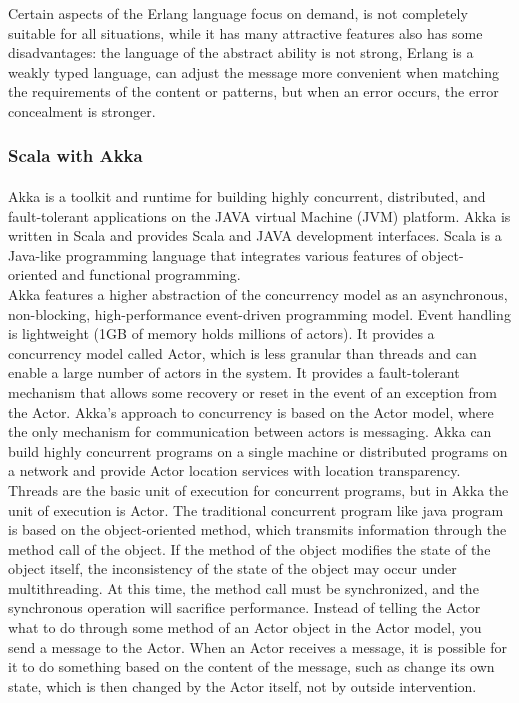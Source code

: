 \documentclass{article}
\begin{document}
Certain aspects of the Erlang language focus on demand, is not completely suitable for all situations, while it has many attractive features also has some disadvantages: the language of the abstract ability is not strong, Erlang is a weakly typed language, can adjust the message more convenient when matching the requirements of the content or patterns, but when an error occurs, the error concealment is stronger.\\

\subsubsection{Scala with Akka}\vspace{16pt}
\paragraph{}\vspace{11pt}\justifying
Akka is a toolkit and runtime for building highly concurrent, distributed, and fault-tolerant applications on the JAVA virtual Machine (JVM) platform. Akka is written in Scala and provides Scala and JAVA development interfaces. Scala is a Java-like programming language that integrates various features of object-oriented and functional programming.\\

Akka features a higher abstraction of the concurrency model as an asynchronous, non-blocking, high-performance event-driven programming model. Event handling is lightweight (1GB of memory holds millions of actors). It provides a concurrency model called Actor, which is less granular than threads and can enable a large number of actors in the system. It provides a fault-tolerant mechanism that allows some recovery or reset in the event of an exception from the Actor. Akka's approach to concurrency is based on the Actor model, where the only mechanism for communication between actors is messaging. Akka can build highly concurrent programs on a single machine or distributed programs on a network and provide Actor location services with location transparency.\\

Threads are the basic unit of execution for concurrent programs, but in Akka the unit of execution is Actor. The traditional concurrent program like java program is based on the object-oriented method, which transmits information through the method call of the object. If the method of the object modifies the state of the object itself, the inconsistency of the state of the object may occur under multithreading. At this time, the method call must be synchronized, and the synchronous operation will sacrifice performance. Instead of telling the Actor what to do through some method of an Actor object in the Actor model, you send a message to the Actor.  When an Actor receives a message, it is possible for it to do something based on the content of the message, such as change its own state, which is then changed by the Actor itself, not by outside intervention.\\
\end{document}
